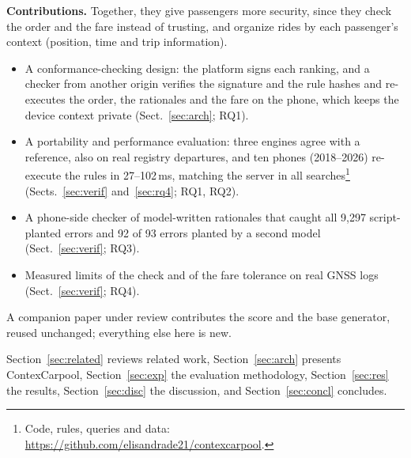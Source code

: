 \documentclass{svproc}
\begin{document}
\textbf{Contributions.} Together, they give passengers more security, since they check the order and the fare instead of trusting, and organize rides by each passenger's context (position, time and trip information).
\begin{itemize}
\item A conformance-checking design: the platform signs each ranking, and a checker from another origin verifies the signature and the rule hashes and re-executes the order, the rationales and the fare on the phone, which keeps the device context private (Sect.~\ref{sec:arch}; RQ1).
\item A portability and performance evaluation: three engines agree with a reference, also on real registry departures, and ten phones (2018--2026) re-execute the rules in 27--102\,ms, matching the server in all searches\footnote{Code, rules, queries and data: \url{https://github.com/elisandrade21/contexcarpool}.} (Sects.~\ref{sec:verif} and~\ref{sec:rq4}; RQ1, RQ2).
\item A phone-side checker of model-written rationales that caught all 9,297 script-planted errors and 92 of 93 errors planted by a second model (Sect.~\ref{sec:verif}; RQ3).
\item Measured limits of the check and of the fare tolerance on real GNSS logs (Sect.~\ref{sec:verif}; RQ4).
\end{itemize}
A companion paper under review contributes the score and the base generator, reused unchanged; everything else here is new.

Section~\ref{sec:related} reviews related work, Section~\ref{sec:arch} presents ContexCarpool, Section~\ref{sec:exp} the evaluation methodology, Section~\ref{sec:res} the results, Section~\ref{sec:disc} the discussion, and Section~\ref{sec:concl} concludes.
\end{document}
